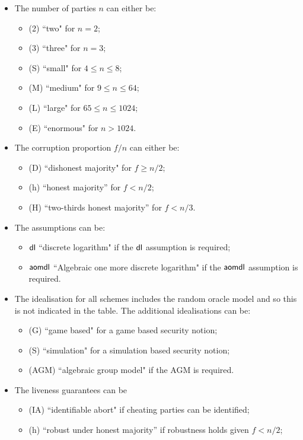 \begin{itemize}
	\item The number of parties $n$ can either be:
	\begin{itemize}
		\item (2) ``two" for $n = 2$;
		\item (3) ``three" for $n = 3$;
		\item  (S) ``small" for $4 \leq n \leq 8$;
		\item  (M) ``medium" for $9 \leq n \leq 64$;
		\item (L) ``large" for $65 \leq n \leq 1024$;
		\item (E) ``enormous" for $n > 1024$.
	\end{itemize}
	\item The corruption proportion $f/n$ can either be:
		\begin{itemize}
			\item  (D) ``dishonest majority" for $f \geq n/2$;
			\item  (h) ``honest majority” for $f < n/2$;
			\item (H) “two-thirds honest majority” for $f < n/3$.
	\end{itemize}
	\item The assumptions can  be:
		\begin{itemize}
			\item $\mathsf{dl}$ ``discrete logarithm" if the $\mathsf{dl}$ assumption is required;
			\item $\mathsf{aomdl}$ ``Algebraic one more discrete logarithm" if the $\mathsf{aomdl}$ assumption is required.
		\end{itemize}
	\item 	The idealisation for all schemes includes the random oracle model and so this is not indicated in the table.  The additional idealisations can be:
		\begin{itemize}
			\item (G)  ``game based" for a game based security notion;
			\item (S) ``simulation" for a simulation based security notion;
			\item (AGM) ``algebraic group model" if the AGM is required.
		\end{itemize}
 	\item The liveness guarantees can be
 		\begin{itemize}
 			\item  (IA) ``identifiable abort" if cheating parties can be identified;
 			\item  (h) ``robust under honest majority” if robustness holds given $f < n/2$;

\end{itemize}
\end{itemize}

